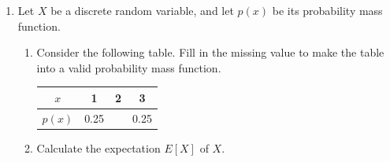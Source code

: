 \documentclass[11pt]{article}
\begin{document}
\begin{enumerate}
\begin{enumerate}
\begin{enumerate}
        \vfill

        \item[(ii)] $\displaystyle\sum_{j=2}^4(j-j^2)$

        \vfill
    \end{enumerate}

    \item Write the following sum in summation notation. 

    \[\dfrac{1}{1}-\dfrac{1}{2}+\dfrac{1}{4}-\dfrac{1}{8}\]

    \vfill
\end{enumerate}


\newpage


\item Let $X$ be a discrete random variable, and let $p(x)$ be its probability mass function.

\begin{enumerate}
    \item Consider the following table. Fill in the missing value to make the table into a valid probability mass function. 

    \vspace{0.5cm}

    \begin{minipage}{0.45\textwidth}
        \centering    
        \begin{tabular}{c|ccc}
            \hline
           $x$  & 1 & 2 & 3  \\
           \hline
           $p(x)$  & 0.25 &  & 0.25\\
           \hline
        \end{tabular}
    \end{minipage}


   \vspace{1cm}


  \item Calculate the expectation $E[X]$ of $X$.
    \vspace{6cm}


\end{enumerate}
\end{enumerate}
\end{document}
